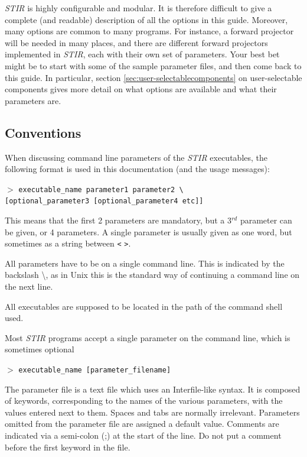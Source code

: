 \documentclass{article}
\newcommand{\cmdline}[1]{\par \noindent $>$ \texttt{#1}\par}
\begin{document}
\textit{STIR} is highly configurable and modular. It is therefore difficult to give a complete (and readable)
description of all the options in this guide. Moreover, many options are common to many
programs. For instance, a forward projector will be needed in many places, and there are 
different forward projectors implemented in \textit{STIR}, each with their own set of 
parameters. Your best bet might be to start with some of the sample parameter files, and then
come back to this guide. In particular, section \ref{sec:user-selectablecomponents}
on user-selectable components gives more detail on what options are available
and what their parameters are.

\subsection{
Conventions}
\label{sec:conventions}
When discussing command line parameters of the \textit{STIR} executables, 
the following format is used in this documentation (and the usage messages):
\cmdline{executable\_name parameter1 parameter2 {\textbackslash}\\
{[}optional\_parameter3 [optional\_parameter4 etc]]}


This means that the first 2 parameters are mandatory, but a 3$^{rd}$ 
parameter can be given, or 4 parameters. A single parameter is 
usually given as one word, but sometimes as a string between 
\texttt{<} \texttt{>}. 


All parameters have to be on a single command line. This is indicated 
by the backslash {\textbackslash}, as in Unix this is the standard way 
of continuing a command line on the next line.


All executables are supposed to be located in the path of the 
command shell used.


Most \textit{STIR} programs accept a single parameter on the command 
line, which is sometimes optional

\cmdline{executable\_name [parameter\_filename]}


The parameter file is a text file which uses an Interfile-like 
syntax. It is composed of keywords, corresponding to the names 
of the various parameters, with the values entered next to them. 
Spaces and tabs are normally irrelevant. Parameters omitted from 
the parameter file are assigned a default value. 
Comments are indicated via a semi-colon (;) at the start of the line. Do
not put a comment before the first keyword in the file.
\end{document}
